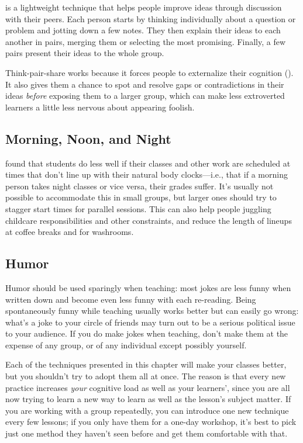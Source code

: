  is a lightweight technique
that helps people improve ideas
through discussion with their peers.
Each person starts by thinking individually about a question or problem
and jotting down a few notes.
They then explain their ideas to each another in pairs,
merging them or selecting the most promising.
Finally,
a few pairs present their ideas to the whole group.

Think-pair-share works because it forces people to externalize their cognition
().
It also gives them a chance to spot and resolve gaps or contradictions in their ideas
\emph{before} exposing them to a larger group,
which can make less extroverted learners a little less nervous
about appearing foolish.

\subsection*{Morning, Noon, and Night}

\cite{Smar2018} found that
students do less well
if their classes and other work are scheduled at times that don't line up with their natural body clocks---i.e.,
that if a morning person takes night classes or vice versa,
their grades suffer.
It's usually not possible to accommodate this in small groups,
but larger ones should try to stagger start times for parallel sessions.
This can also help people juggling childcare responsibilities and other constraints,
and reduce the length of lineups at coffee breaks and for washrooms.

\subsection*{Humor}

Humor should be used sparingly when teaching:
most jokes are less funny when written down
and become even less funny with each re-reading.
Being spontaneously funny while teaching usually works better
but can easily go wrong:
what's a joke to your circle of friends
may turn out to be a serious political issue to your audience.
If you do make jokes when teaching,
don't make them at the expense of any group,
or of any individual except possibly yourself.


Each of the techniques presented in this chapter will make your classes better,
but you shouldn't try to adopt them all at once.
The reason is that every new practice increases \emph{your} cognitive load as well as your learners',
since you are all now trying to learn a new way to learn
as well as the lesson's subject matter.
If you are working with a group repeatedly,
you can introduce one new technique every few lessons;
if you only have them for a one-day workshop,
it's best to pick just one method they haven't seen before
and get them comfortable with that.

